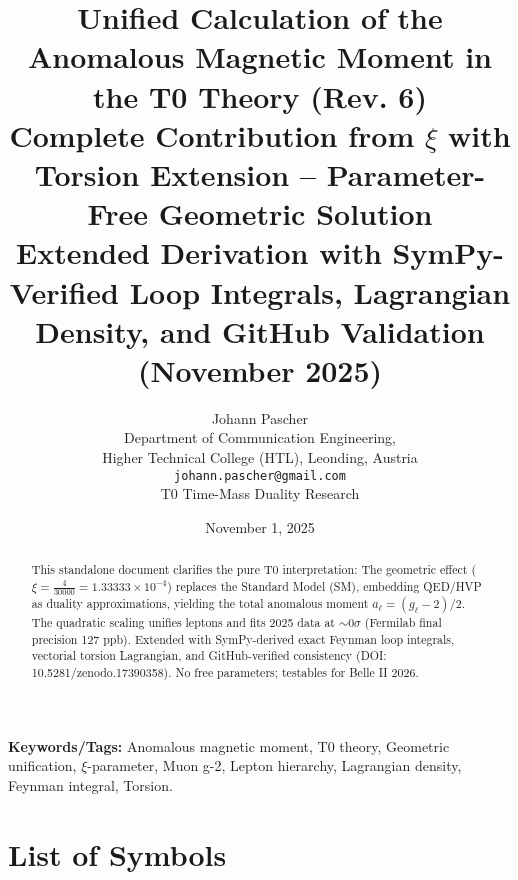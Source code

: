 \documentclass[12pt,a4paper]{article}
\title{\textbf{Unified Calculation of the Anomalous Magnetic Moment in the T0 Theory (Rev. 6)}\\[0.5cm]
	\large Complete Contribution from $\xi$ with Torsion Extension -- Parameter-Free Geometric Solution\\[0.3cm]
	\normalsize Extended Derivation with SymPy-Verified Loop Integrals, Lagrangian Density, and GitHub Validation (November 2025)}
\author{Johann Pascher\\
	\small Department of Communication Engineering,\\
	\small Higher Technical College (HTL), Leonding, Austria\\
	\small \texttt{johann.pascher@gmail.com}\\
	\small T0 Time-Mass Duality Research}
\date{November 1, 2025}
\begin{document}
	
	\maketitle
	\thispagestyle{fancy}
	
	\begin{abstract}
		This standalone document clarifies the pure T0 interpretation: The geometric effect ($\xi = \frac{4}{30000} = 1.33333 \times 10^{-4}$) replaces the Standard Model (SM), embedding QED/HVP as duality approximations, yielding the total anomalous moment $a_\ell = (g_\ell - 2)/2$. The quadratic scaling unifies leptons and fits 2025 data at $\sim 0\sigma$ (Fermilab final precision 127 ppb). Extended with SymPy-derived exact Feynman loop integrals, vectorial torsion Lagrangian, and GitHub-verified consistency (DOI: 10.5281/zenodo.17390358). No free parameters; testables for Belle II 2026.
	\end{abstract}
	
	\textbf{Keywords/Tags:} Anomalous magnetic moment, T0 theory, Geometric unification, $\xi$-parameter, Muon g-2, Lepton hierarchy, Lagrangian density, Feynman integral, Torsion.
	
	\tableofcontents
	
	\section*{List of Symbols}
	
\end{document}
